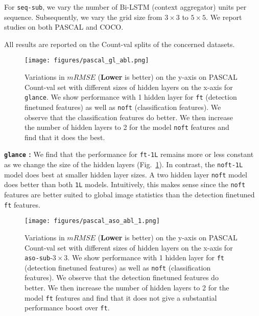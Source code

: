 \documentclass[10pt,twocolumn,letterpaper]{article}
\newcommand{\sub}{\texttt{aso-sub}\xspace}
\newcommand{\seq}{\texttt{seq-sub}\xspace}
\newcommand{\glance}{\texttt{glance}\xspace}
\newcommand{\reffig}[1]{Fig.~\ref{#1}}
\begin{document}
For \seq, we vary the number of Bi-LSTM (context aggregator) units per sequence. Subsequently, we vary the grid size from $3\times3$ to $5\times5$. We report studies on both PASCAL and COCO.

All results are reported on the Count-val splits of the concerned datasets.





\begin{figure}
\texttt{[image: figures/pascal\_gl\_abl.png]}
\caption{Variations in $mRMSE$ (\textbf{Lower} is better) on the y-axis on PASCAL Count-val set with different sizes of hidden layers on the x-axis for \glance. We show performance with 1 hidden layer for \texttt{ft} (detection finetuned features) as well as \texttt{noft} (classification features). We observe that the classification features do better. We then increase the number of hidden layers to 2 for the model \texttt{noft} features and find that it does the best.}
\label{fig:pascal_glance}
\end{figure}

\textbf{\glance{} : }
We find that the performance for \texttt{ft-1L} remains more or less constant as we change the size of the hidden layers (\reffig{fig:pascal_glance}). In contrast, the \texttt{noft-1L} model does best at smaller hidden layer sizes. A two hidden layer \texttt{noft} model does better than both \texttt{1L} models. Intuitively, this makes sense since the \texttt{noft} features are better suited to global image statistics than the detection finetuned \texttt{ft} features.

\begin{figure}
\texttt{[image: figures/pascal\_aso\_abl\_1.png]}
\caption{Variations in $mRMSE$ (\textbf{Lower} is better) on the y-axis on PASCAL Count-val set with different sizes of hidden layers on the x-axis for \sub-\texttt{$3\times3$}. We show performance with 1 hidden layer for \texttt{ft} (detection finetuned features) as well as \texttt{noft} (classification features). We observe that the detection finetuned features do better. We then increase the number of hidden layers to 2 for the model \texttt{ft} features and find that it does not give a substantial performance boost over \texttt{ft}.}
\label{fig:pascal_asosub}
\end{figure}
\end{document}
